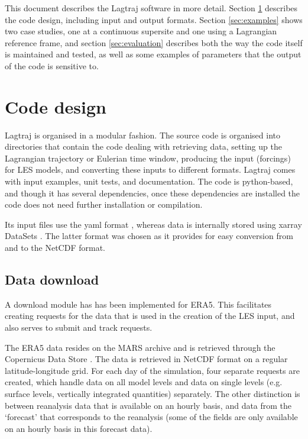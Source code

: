 \documentclass[a4paper,11pt]{article}
\begin{document}
This document describes the Lagtraj software in more detail. Section
\ref{sec:design} describes the code design, including input and output
formats. Section \ref{sec:examples} shows two case studies, one at a
continuous supersite and one using a Lagrangian reference frame, and
section \ref{sec:evaluation} describes both the way the code itself is
maintained and tested, as well as some examples of parameters that the
output of the code is sensitive to.

\section{Code design}\label{sec:design}

Lagtraj is organised in a modular fashion. The source code is organised
into directories that contain the code dealing with retrieving data,
setting up the Lagrangian trajectory or Eulerian time window, producing
the input (forcings) for LES models, and converting these inputs to
different formats. Lagtraj comes with input examples, unit tests, and
documentation. The code is python-based, and though it has several
dependencies, once these dependencies are installed the code does not
need further installation or compilation.

Its input files use the yaml format \citep{ben2009}, whereas data is
internally stored using xarray DataSets \citep{hoyer2017}. The latter
format was chosen as it provides for easy conversion from and to the
NetCDF format.

\subsection{Data download}

A download module has has been implemented for ERA5. This facilitates
creating requests for the data that is used in the creation of the LES
input, and also serves to submit and track requests.

The ERA5 data resides on the MARS archive and is retrieved through the
Copernicus Data Store \citep{raoult2017}. The data is retrieved in
NetCDF format on a regular latitude-longitude grid. For each day of the
simulation, four separate requests are created, which handle data on
all model levels and data on single levels (e.g. surface levels,
vertically integrated quantities) separately. The other distinction is
between reanalysis data that is available on an hourly basis, and data
from the `forecast' that corresponds to the reanalysis (some of the
fields are only available on an hourly basis in this forecast data).
\end{document}
